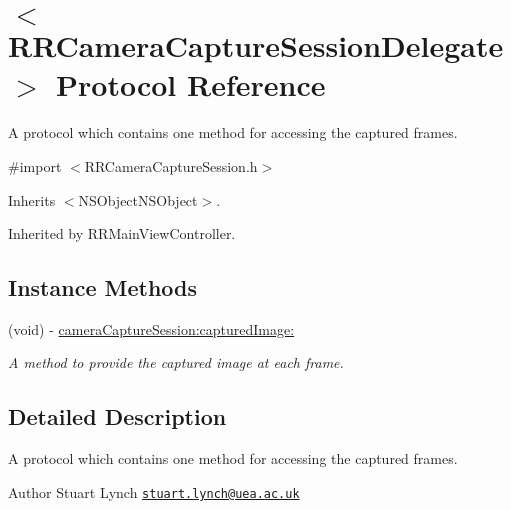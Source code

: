 \hypertarget{protocol_r_r_camera_capture_session_delegate-p}{\section{$<$R\-R\-Camera\-Capture\-Session\-Delegate$>$ Protocol Reference}
\label{protocol_r_r_camera_capture_session_delegate-p}
}


A protocol which contains one method for accessing the captured frames.  




{\ttfamily \#import $<$R\-R\-Camera\-Capture\-Session.\-h$>$}



Inherits $<$\-N\-S\-Object\-N\-S\-Object$>$.



Inherited by R\-R\-Main\-View\-Controller.

\subsection*{Instance Methods}
\begin{DoxyCompactItemize}
\item 
(void) -\/ \hyperlink{protocol_r_r_camera_capture_session_delegate-p_a09f9d4c430ad57f128ddc85c3ac26110}{camera\-Capture\-Session\-:captured\-Image\-:}
\begin{DoxyCompactList}\small\item\em A method to provide the captured image at each frame. \end{DoxyCompactList}\end{DoxyCompactItemize}


\subsection{Detailed Description}
A protocol which contains one method for accessing the captured frames. 

\begin{DoxyAuthor}{Author}
Stuart Lynch \href{mailto:stuart.lynch@uea.ac.uk}{\tt stuart.\-lynch@uea.\-ac.\-uk} 
\end{DoxyAuthor}


